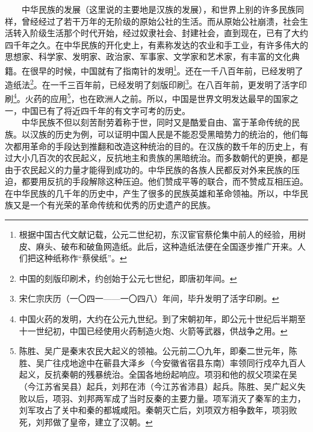 \documentclass[cn,11pt,chinese]{elegantbook}
\begin{document}
　　中华民族的发展（这里说的主要地是汉族的发展），和世界上别的许多民族同样，曾经经过了若干万年的无阶级的原始公社的生活。而从原始公社崩溃，社会生活转入阶级生活那个时代开始，经过奴隶社会、封建社会，直到现在，已有了大约四千年之久。在中华民族的开化史上，有素称发达的农业和手工业，有许多伟大的思想家、科学家、发明家、政治家、军事家、文学家和艺术家，有丰富的文化典籍。在很早的时候，中国就有了指南针的发明\footnote[2]{ 根据中国古代文献记载，公元二世纪初，东汉宦官蔡伦集中前人的经验，用树皮、麻头、破布和破鱼网造纸。此后，这种造纸法便在全国逐步推广开来。人们把这种纸称作“蔡侯纸”。}。还在一千八百年前，已经发明了造纸法\footnote[3]{ 中国的刻版印刷术，约创始于公元七世纪，即唐初年间。}。在一千三百年前，已经发明了刻版印刷\footnote[4]{ 宋仁宗庆历（一〇四一——一〇四八）年间，毕升发明了活字印刷。}。在八百年前，更发明了活字印刷\footnote[5]{ 中国火药的发明，大约在公元九世纪。到了宋朝初年，即公元十世纪后半期至十一世纪初，中国已经使用火药制造火炮、火箭等武器，供战争之用。}。火药的应用\footnote[6]{ 陈胜、吴广是秦末农民大起义的领袖。公元前二〇九年，即秦二世元年，陈胜、吴广往戍地途中在蕲县大泽乡（今安徽省宿县东南）率领同行戍卒九百人起义，反抗秦朝的残暴统治。全国各地纷起响应。项羽和他的叔父项梁在吴（今江苏省吴县）起兵，刘邦在沛（今江苏省沛县）起兵。陈胜、吴广起义失败以后，项羽、刘邦两军成了当时反秦的主要力量。项军消灭了秦军的主力，刘军攻占了关中和秦的都城咸阳。秦朝灭亡后，刘项双方相争数年，项羽败死，刘邦做了皇帝，建立了汉朝。}，也在欧洲人之前。所以，中国是世界文明发达最早的国家之一，中国已有了将近四千年的有文字可考的历史。\\
　　中华民族不但以刻苦耐劳着称于世，同时又是酷爱自由、富于革命传统的民族。以汉族的历史为例，可以证明中国人民是不能忍受黑暗势力的统治的，他们每次都用革命的手段达到推翻和改造这种统治的目的。在汉族的数千年的历史上，有过大小几百次的农民起义，反抗地主和贵族的黑暗统治。而多数朝代的更换，都是由于农民起义的力量才能得到成功的。中华民族的各族人民都反对外来民族的压迫，都要用反抗的手段解除这种压迫。他们赞成平等的联合，而不赞成互相压迫。在中华民族的几千年的历史中，产生了很多的民族英雄和革命领袖。所以，中华民族又是一个有光荣的革命传统和优秀的历史遗产的民族。\\
\end{document}
